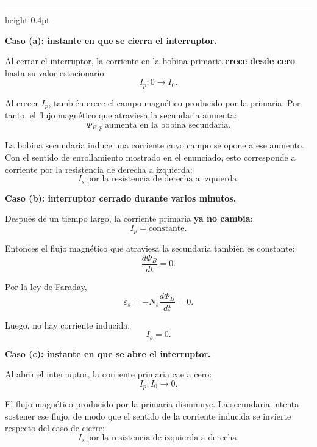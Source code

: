 \documentclass[11pt]{article}
\newcommand{\soluciontitulo}{%
  \par\medskip
  \noindent{\large\bfseries Solución.}\par
  \vspace{0.2em}\hrule height 0.4pt \vspace{0.7em}%
}
\newcommand{\paso}[1]{%
  \par\medskip
  \noindent\textbf{#1}\par
  \vspace{0.1em}%
}
\begin{document}
\soluciontitulo

\paso{Caso (a): instante en que se cierra el interruptor.}
Al cerrar el interruptor, la corriente en la bobina primaria \textbf{crece desde cero} hasta su valor estacionario:
\begin{equation*}
    I_p:0\longrightarrow I_0.
\end{equation*}

Al crecer $I_p$, tambi\'en crece el campo magn\'etico producido por la primaria. Por tanto, el flujo magn\'etico que atraviesa la secundaria aumenta:
\begin{equation*}
    \Phi_{B,p}\ \text{aumenta en la bobina secundaria}.
\end{equation*}

La bobina secundaria induce una corriente cuyo campo se opone a ese aumento. Con el sentido de enrollamiento mostrado en el enunciado, esto corresponde a corriente por la resistencia de derecha a izquierda:
\begin{equation*}
    \boxed{I_s\ \text{por la resistencia de derecha a izquierda}.}
\end{equation*}

\paso{Caso (b): interruptor cerrado durante varios minutos.}
Despu\'es de un tiempo largo, la corriente primaria \textbf{ya no cambia}:
\begin{equation*}
    I_p=\text{constante}.
\end{equation*}

Entonces el flujo magn\'etico que atraviesa la secundaria tambi\'en es constante:
\begin{equation*}
    \frac{d\Phi_B}{dt}=0.
\end{equation*}

Por la ley de Faraday,
\begin{equation*}
    \varepsilon_s=-N_s\frac{d\Phi_B}{dt}=0.
\end{equation*}

Luego, no hay corriente inducida:
\begin{equation*}
    \boxed{I_s=0.}
\end{equation*}

\paso{Caso (c): instante en que se abre el interruptor.}
Al abrir el interruptor, la corriente primaria cae a cero:
\begin{equation*}
    I_p:I_0\longrightarrow 0.
\end{equation*}

El flujo magn\'etico producido por la primaria disminuye. La secundaria intenta sostener ese flujo, de modo que el sentido de la corriente inducida se invierte respecto del caso de cierre:
\begin{equation*}
    \boxed{I_s\ \text{por la resistencia de izquierda a derecha}.}
\end{equation*}
\end{document}
